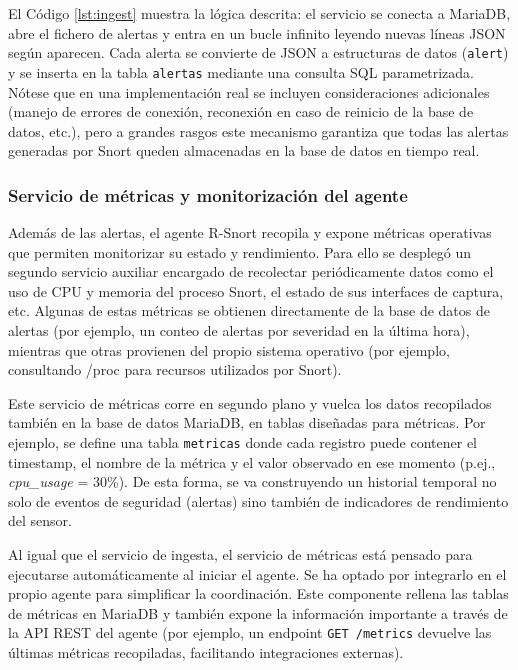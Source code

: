 \documentclass[11pt,a4paper,twoside]{report}
\begin{document}
El Código \ref{lst:ingest} muestra la lógica descrita: el servicio se conecta a MariaDB, abre el fichero de alertas y entra en un bucle infinito leyendo nuevas líneas JSON según aparecen. Cada alerta se convierte de JSON a estructuras de datos (\texttt{alert}) y se inserta en la tabla \texttt{alertas} mediante una consulta SQL parametrizada. Nótese que en una implementación real se incluyen consideraciones adicionales (manejo de errores de conexión, reconexión en caso de reinicio de la base de datos, etc.), pero a grandes rasgos este mecanismo garantiza que todas las alertas generadas por Snort queden almacenadas en la base de datos en tiempo real.

\subsubsection{Servicio de métricas y monitorización del agente}

Además de las alertas, el agente R-Snort recopila y expone métricas operativas que permiten monitorizar su estado y rendimiento. Para ello se desplegó un segundo servicio auxiliar encargado de recolectar periódicamente datos como el uso de CPU y memoria del proceso Snort, el estado de sus interfaces de captura, etc. Algunas de estas métricas se obtienen directamente de la base de datos de alertas (por ejemplo, un conteo de alertas por severidad en la última hora), mientras que otras provienen del propio sistema operativo (por ejemplo, consultando /proc para recursos utilizados por Snort).\newline

Este servicio de métricas corre en segundo plano y vuelca los datos recopilados también en la base de datos MariaDB, en tablas diseñadas para métricas. Por ejemplo, se define una tabla \texttt{metricas} donde cada registro puede contener el timestamp, el nombre de la métrica y el valor observado en ese momento (p.ej., \textit{cpu\_usage} = 30\%). De esta forma, se va construyendo un historial temporal no solo de eventos de seguridad (alertas) sino también de indicadores de rendimiento del sensor.\newline

Al igual que el servicio de ingesta, el servicio de métricas está pensado para ejecutarse automáticamente al iniciar el agente. Se ha optado por integrarlo en el propio agente para simplificar la coordinación. Este componente rellena las tablas de métricas en MariaDB y también expone la información importante a través de la API REST del agente (por ejemplo, un endpoint \verb|GET /metrics| devuelve las últimas métricas recopiladas, facilitando integraciones externas).
\end{document}
